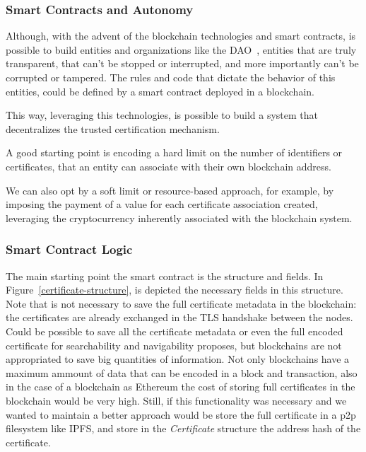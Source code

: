 \subsubsection{Smart Contracts and Autonomy}
Although, with the advent of the blockchain technologies and smart contracts, is possible to build entities and organizations like the DAO~\cite{ralphc.merkle2016}, entities that are truly transparent, that can't be stopped or interrupted, and more importantly can't be corrupted or tampered.
The rules and code that dictate the behavior of this entities, could be defined by a smart contract deployed in a blockchain.

This way, leveraging this technologies, is possible to build a system that decentralizes the trusted certification mechanism.

A good starting point is encoding a hard limit on the number of identifiers or certificates, that an entity can associate with their own blockchain address.

We can also opt by a soft limit or resource-based approach, for example, by imposing the payment of a value for each certificate association created, leveraging the cryptocurrency inherently associated with the blockchain system.

\subsubsection{Smart Contract Logic}
The main starting point the smart contract is the  structure and fields.
In Figure~\ref{certificate-structure}, is depicted the necessary fields in this structure.
Note that is not necessary to save the full certificate metadata in the blockchain: the certificates are already exchanged in the TLS handshake between the nodes.
Could be possible to save all the certificate metadata or even the full encoded certificate for searchability and navigability proposes, but blockchains are not appropriated to save big quantities of information.
Not only blockchains have a maximum ammount of data that can be encoded in a block and transaction, also in the case of a blockchain as Ethereum the cost of storing full certificates in the blockchain would be very high.
Still, if this functionality was necessary and we wanted to maintain a better approach would be store the full certificate in a \ac{p2p} filesystem like \ac{IPFS}, and store in the \textit{Certificate} structure the address hash of the certificate.

